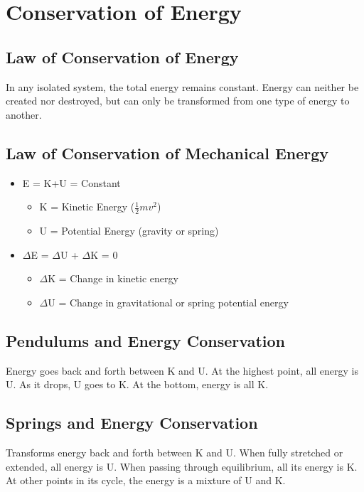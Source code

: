 \section{Conservation of Energy}

\subsection{Law of Conservation of Energy}
In any isolated system, the total energy remains constant. Energy can neither be created nor destroyed, but can only be transformed from one type of energy to another. 

\subsection{Law of Conservation of Mechanical Energy}
\begin{itemize}
	\item E = K+U = Constant
	\begin{itemize}
		\item K = Kinetic Energy ($\frac{1}{2}mv^2$)
		\item U = Potential Energy (gravity or spring)
	\end{itemize}
	
	\item $\Delta$E = $\Delta$U + $\Delta$K = 0
		\begin{itemize}
		\item $\Delta$K = Change in kinetic energy
		\item $\Delta$U = Change in gravitational or spring potential energy
	\end{itemize}
\end{itemize}

\subsection{Pendulums and Energy Conservation}
Energy goes back and forth between K and U. At the highest point, all energy is U. As it drops, U goes to K. At the bottom, energy is all K.

\subsection{Springs and Energy Conservation}
Transforms energy back and forth between K and U. When fully stretched or extended, all energy is U. When passing through equilibrium, all its energy is K. At other points in its cycle, the energy is a mixture of U and K.

